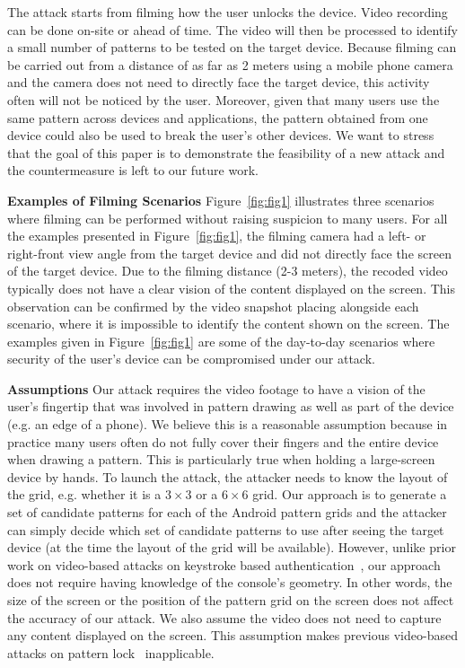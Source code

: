 The attack starts from filming how the user unlocks the device. Video recording
can be done on-site or ahead of time. The video will then be processed to identify a small number of patterns to be
tested on the target device. Because filming can be carried out from a distance of as far as 2 meters using a
mobile phone camera and the camera does not need to directly face the target device, this activity often will not be
noticed by the user. Moreover, given that many users use the same pattern across devices and applications, the pattern
obtained from one device could also be used to break the user's other devices.  We want to stress that the goal of this paper is to
demonstrate the feasibility of a new attack and the countermeasure is left to our future work.

\vspace{2mm}
\noindent \textbf{Examples of Filming Scenarios} Figure~\ref{fig:fig1} illustrates three scenarios where filming can be
performed without raising suspicion to many users. For all the examples presented in Figure~\ref{fig:fig1}, the
filming camera had a left- or right-front view angle from the target device and did not directly face the screen of the target device. Due to the filming distance (2-3 meters), the recoded video typically does not have a clear vision of
the content displayed on the screen.  This observation can be confirmed by the video snapshot placing
alongside each scenario, where it is impossible to identify the content shown on the screen.
The examples given in Figure~\ref{fig:fig1} are some of the day-to-day
scenarios where security of the user's device can be compromised under
our attack.

\vspace{2mm}
\noindent \textbf{Assumptions}
Our attack requires the video footage to have a vision of the user's
fingertip that was involved in pattern drawing as well as part of the device (e.g. an edge of a phone).
We believe this is a reasonable assumption because in practice many users often do not fully cover their fingers and the entire device when drawing a pattern.
This is particularly true when holding a large-screen device by hands.
To launch the
attack, the attacker needs to know the layout of the grid, e.g. whether it is
a $3 \times 3$ or a $6 \times 6$ grid. Our approach is to generate a set of
candidate patterns for each of the Android pattern grids and the attacker can simply decide
which set of candidate patterns to use after seeing the target device (at the time the
layout of the grid will be available). However, unlike prior work on
video-based attacks on keystroke based authentication~\cite{shukla2014beware}, our approach does not
require having knowledge of the console's geometry. In other words, the size
of the screen or the position of the pattern grid  on the screen does not
affect the accuracy of our attack. We also assume the video does not need to
capture any content displayed on the screen. This assumption makes previous
video-based attacks on pattern lock~\cite{aviv2010smudge} inapplicable.
